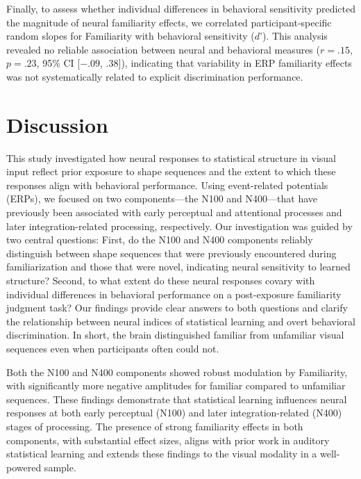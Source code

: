 Finally, to assess whether individual differences in behavioral sensitivity predicted the magnitude of neural familiarity effects, we correlated participant-specific random slopes for Familiarity with behavioral sensitivity ($d’$). This analysis revealed no reliable association between neural and behavioral measures ($r = .15$, $p = .23$, 95\% CI [$-.09$, $.38$]), indicating that variability in ERP familiarity effects was not systematically related to explicit discrimination performance.



\section*{Discussion}
This study investigated how neural responses to statistical structure in visual input reflect prior exposure to shape sequences and the extent to which these responses align with behavioral performance. Using event-related potentials (ERPs), we focused on two components—the N100 and N400—that have previously been associated with early perceptual and attentional processes and later integration-related processing, respectively. Our investigation was guided by two central questions: First, do the N100 and N400 components reliably distinguish between shape sequences that were previously encountered during familiarization and those that were novel, indicating neural sensitivity to learned structure? Second, to what extent do these neural responses covary with individual differences in behavioral performance on a post-exposure familiarity judgment task? Our findings provide clear answers to both questions and clarify the relationship between neural indices of statistical learning and overt behavioral discrimination. In short, the brain distinguished familiar from unfamiliar visual sequences even when participants often could not.

Both the N100 and N400 components showed robust modulation by Familiarity, with significantly more negative amplitudes for familiar compared to unfamiliar sequences. These findings demonstrate that statistical learning influences neural responses at both early perceptual (N100) and later integration-related (N400) stages of processing. The presence of strong familiarity effects in both components, with substantial effect sizes, aligns with prior work in auditory statistical learning and extends these findings to the visual modality in a well-powered sample.

